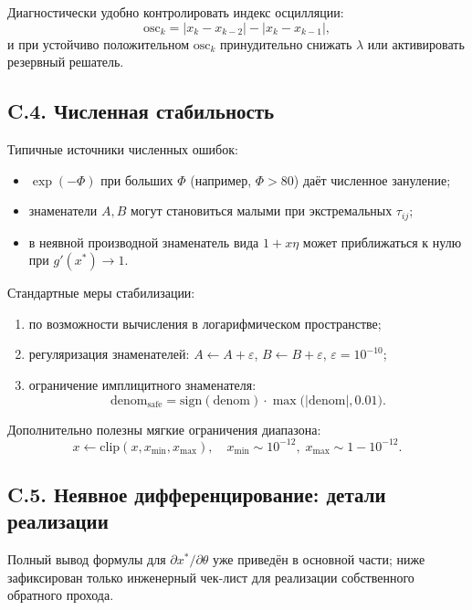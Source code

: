 \documentclass[11pt]{article}
\begin{document}
Диагностически удобно контролировать индекс осцилляции:
\begin{equation*}
\mathrm{osc}_k = |x_k-x_{k-2}| - |x_k-x_{k-1}|,
\end{equation*}
и при устойчиво положительном $\mathrm{osc}_k$ принудительно снижать $\lambda$ или активировать резервный решатель.

\subsection*{C.4. Численная стабильность}

Типичные источники численных ошибок:
\begin{itemize}
  \item $\exp(-\Phi)$ при больших $\Phi$ (например, $\Phi>80$) даёт численное зануление;
  \item знаменатели $A,B$ могут становиться малыми при экстремальных $\tau_{ij}$;
  \item в неявной производной знаменатель вида $1+x\eta$ может приближаться к нулю при $g'(x^*)\to 1$.
\end{itemize}

Стандартные меры стабилизации:
\begin{enumerate}
  \item по возможности вычисления в логарифмическом пространстве;
  \item регуляризация знаменателей: $A\leftarrow A+\varepsilon$, $B\leftarrow B+\varepsilon$, $\varepsilon=10^{-10}$;
  \item ограничение имплицитного знаменателя:
\begin{equation*}
\mathrm{denom}_{\mathrm{safe}}=\mathrm{sign}(\mathrm{denom})\cdot\max\bigl(|\mathrm{denom}|,0.01\bigr).
\end{equation*}
\end{enumerate}

Дополнительно полезны мягкие ограничения диапазона:
\begin{equation*}
x\leftarrow \mathrm{clip}(x, x_{\min}, x_{\max}),
\quad
x_{\min}\sim10^{-12},\; x_{\max}\sim 1-10^{-12}.
\end{equation*}

\subsection*{C.5. Неявное дифференцирование: детали реализации}

Полный вывод формулы для $\partial x^*/\partial\theta$ уже приведён в основной части; ниже зафиксирован только инженерный чек-лист для реализации собственного обратного прохода.
\end{document}
